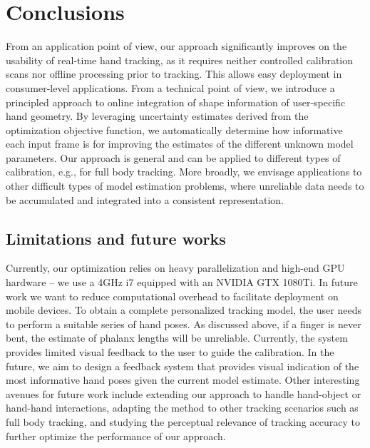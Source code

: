 
\section{Conclusions}
From an application point of view, our approach significantly improves on the usability of real-time hand tracking, as it requires neither controlled calibration scans nor offline processing prior to tracking. This allows easy deployment in consumer-level applications. From a technical point of view, we introduce a principled approach to online integration of shape information of user-specific hand geometry. By leveraging uncertainty estimates derived from the optimization objective function, we automatically determine how informative each input frame is for improving the estimates of the different unknown model parameters. Our approach is general and can be applied to different types of calibration, e.g., for full body tracking. More broadly, we envisage applications to other difficult types of model estimation problems, where unreliable data needs to be accumulated and integrated into a consistent representation. 

\subsection*{Limitations and future works}
Currently, our optimization relies on heavy parallelization and high-end GPU hardware -- we use a 4GHz i7 equipped with an NVIDIA GTX 1080Ti. In future work we want to reduce computational overhead to facilitate deployment on mobile devices.
To obtain a complete personalized tracking model, the user needs to perform a suitable series of hand poses. As discussed above, if a finger is never bent, the estimate of phalanx lengths will be unreliable. Currently, the system provides limited visual feedback to the user to guide the calibration. In the future, we aim to design a feedback system that provides visual indication of the most informative hand poses given the current model estimate. 
Other interesting avenues for future work include extending our approach to handle hand-object or hand-hand interactions, adapting the method to other tracking scenarios such as full body tracking, and studying the perceptual relevance of tracking accuracy to further optimize the performance of our approach.



